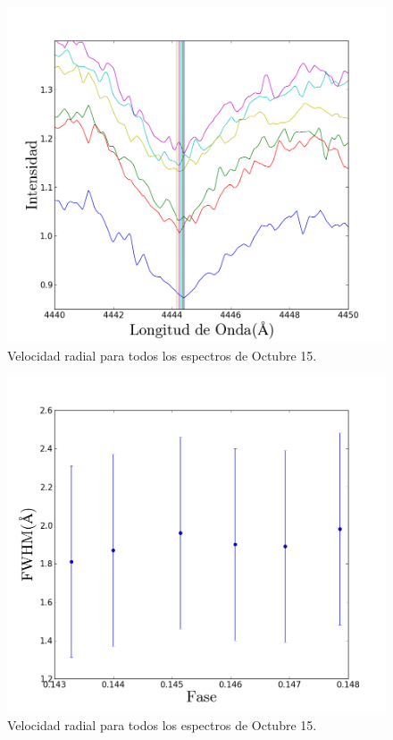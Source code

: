 \documentclass[Proceedings]{ascelike}
\begin{document}
\begin{figure}
\includegraphics[scale=0.5]{epscraEspectra.png}
\caption{Velocidad radial para todos los espectros de Octubre 15. \label{AllSpectra}}
\end{figure}

\begin{figure}
\includegraphics[scale=0.5]{anchovsfase.png}
\caption{Velocidad radial para todos los espectros de Octubre 15. \label{FWHM}}
\end{figure}
\end{document}
